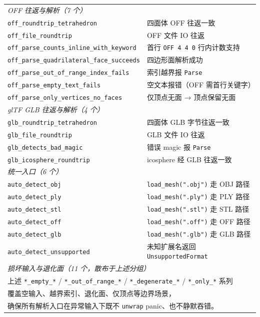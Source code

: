 \documentclass[11pt,a4paper]{article}
\begin{document}
\begin{longtable}{@{}ll@{}}
  \midrule
  \multicolumn{2}{l}{\textit{OFF 往返与解析（7 个）}} \\
  \texttt{off\_roundtrip\_tetrahedron}               & 四面体 OFF 往返一致 \\
  \texttt{off\_file\_roundtrip}                      & OFF 文件 IO 往返 \\
  \texttt{off\_parse\_counts\_inline\_with\_keyword} & 首行 \texttt{OFF 4 4 0} 行内计数支持 \\
  \texttt{off\_parse\_quadrilateral\_face\_succeeds} & 四边形面解析成功 \\
  \texttt{off\_parse\_out\_of\_range\_index\_fails}  & 索引越界报 \texttt{Parse} \\
  \texttt{off\_parse\_empty\_text\_fails}            & 空文本报错（OFF 需首行关键字） \\
  \texttt{off\_parse\_only\_vertices\_no\_faces}     & 仅顶点无面 → 顶点保留无面 \\
  \midrule
  \multicolumn{2}{l}{\textit{glTF GLB 往返与解析（4 个）}} \\
  \texttt{glb\_roundtrip\_tetrahedron}               & 四面体 GLB 字节往返一致 \\
  \texttt{glb\_file\_roundtrip}                      & GLB 文件 IO 往返 \\
  \texttt{glb\_detects\_bad\_magic}                  & 错误 magic 报 \texttt{Parse} \\
  \texttt{glb\_icosphere\_roundtrip}                 & icosphere 经 GLB 往返一致 \\
  \midrule
  \multicolumn{2}{l}{\textit{统一入口（6 个）}} \\
  \texttt{auto\_detect\_obj}                         & \texttt{load\_mesh(".obj")} 走 OBJ 路径 \\
  \texttt{auto\_detect\_ply}                         & \texttt{load\_mesh(".ply")} 走 PLY 路径 \\
  \texttt{auto\_detect\_stl}                         & \texttt{load\_mesh(".stl")} 走 STL 路径 \\
  \texttt{auto\_detect\_off}                         & \texttt{load\_mesh(".off")} 走 OFF 路径 \\
  \texttt{auto\_detect\_glb}                         & \texttt{load\_mesh(".glb")} 走 GLB 路径 \\
  \texttt{auto\_detect\_unsupported}                 & 未知扩展名返回 \texttt{UnsupportedFormat} \\
  \midrule
  \multicolumn{2}{l}{\textit{损坏输入与退化面（11 个，散布于上述分组）}} \\
  \multicolumn{2}{l}{上述 \texttt{*\_empty\_*} / \texttt{*\_out\_of\_range\_*} / \texttt{*\_degenerate\_*} / \texttt{*\_only\_*} 系列} \\
  \multicolumn{2}{l}{覆盖空输入、越界索引、退化面、仅顶点等边界场景，} \\
  \multicolumn{2}{l}{确保所有解析入口在异常输入下既不 \texttt{unwrap} panic、也不静默吞错。} \\
  \bottomrule
\end{longtable}
\end{document}
